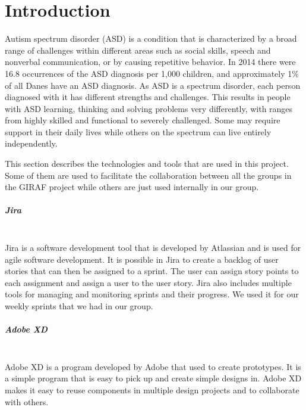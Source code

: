 \chapter{Introduction}
Autism spectrum disorder (ASD) is a condition that is characterized by a broad range of challenges within different areas such as social skills, speech and nonverbal communication, or by causing repetitive behavior.
In 2014 there were 16.8 occurrences of the ASD diagnosis per 1,000 children, and approximately 1\% of all Danes have an ASD diagnosis\autocite{cdcdata}. 
As ASD is a spectrum disorder, each person diagnosed with it has different strengths and challenges.
This results in people with ASD learning, thinking and solving problems very differently, with ranges from highly skilled and functional to severely challenged. 
Some may require support in their daily lives while others on the spectrum can live entirely independently\autocite{autismspeaks}.




This section describes the technologies and tools that are used in this project. 
Some of them are used to facilitate the collaboration between all the groups in the GIRAF project while others are just used internally in our group.

\paragraph{Jira}~\\
Jira is a software development tool that is developed by Atlassian and is used for agile software development.
It is possible in Jira to create a backlog of user stories that can then be assigned to a sprint. The user can assign story points to each assignment and assign a user to the user story.
Jira also includes multiple tools for managing and monitoring sprints and their progress.
We used it for our weekly sprints that we had in our group.

\paragraph{Adobe XD}~\\
Adobe XD is a program developed by Adobe that used to create prototypes.
It is a simple program that is easy to pick up and create simple designs in.
Adobe XD makes it easy to reuse components in multiple design projects and to collaborate with others.

